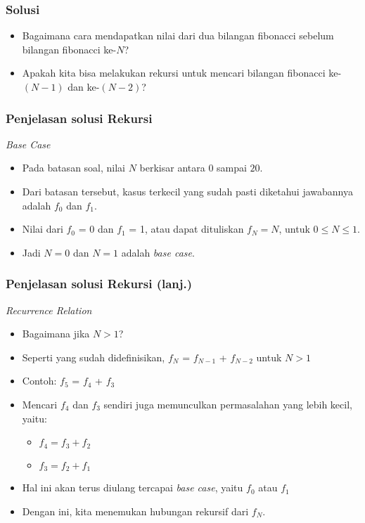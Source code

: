 \begin{frame}
\frametitle{Solusi}
\begin{itemize}
  \item Bagaimana cara mendapatkan nilai dari dua bilangan fibonacci sebelum bilangan fibonacci ke-$N$?
  \item Apakah kita bisa melakukan rekursi untuk mencari bilangan fibonacci ke-$(N-1)$ dan ke-$(N-2)$?
\end{itemize}
\end{frame}

\begin{frame}
\frametitle{Penjelasan solusi Rekursi}
\textit{Base Case}
\begin{itemize}
  \item Pada batasan soal, nilai $N$ berkisar antara $0$ sampai $20$.
  \item Dari batasan tersebut, kasus terkecil yang sudah pasti diketahui jawabannya adalah $f_0$ dan $f_1$.
  \item Nilai dari $f_0$ = 0 dan $f_1$ = 1, atau dapat dituliskan $f_N = N$, untuk $0 \le N \le 1$.
  \item Jadi $N=0$ dan $N=1$ adalah \textit{base case}.
\end{itemize}
\end{frame}

\begin{frame}
\frametitle{Penjelasan solusi Rekursi (lanj.) }
\textit{Recurrence Relation}
\begin{itemize}
  \item Bagaimana jika $N > 1$?
  \item Seperti yang sudah didefinisikan, $f_N$ = $f_{N-1}$ + $f_{N-2}$ untuk $N > 1$
  \item Contoh: $f_5$ = $f_4$ + $f_3$
  \item Mencari $f_4$ dan $f_3$ sendiri juga memunculkan permasalahan yang lebih kecil, yaitu:
  \begin{itemize}
    \item $f_4 = f_3 + f_2$
    \item $f_3 = f_2 + f_1$ 
  \end{itemize}
  \item Hal ini akan terus diulang tercapai \textit{base case}, yaitu $f_0$ atau $f_1$
  \item Dengan ini, kita menemukan hubungan rekursif dari $f_N$.
\end{itemize}
\end{frame}

